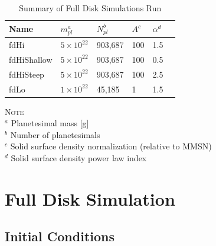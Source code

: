 \documentclass[twocolumn]{aastex63}
\begin{document}
\begin{table}
\caption{Summary of Full Disk Simulations Run}
\begin{tabular}{llllll} \hline \hline
Name    & $m_{pl}^{a}$ & $N_{pl}^{b}$ & $A^{c}$ & $\alpha^{d}$ &  \\ \hline
fdHi                 & $5 \times 10^{22}$ & 903,687 & 100                                                         & 1.5                              &   \\
fdHiShallow    & $5 \times 10^{22}$ & 903,687 & 100                                                        & 0.5                              &   \\
fdHiSteep       & $5 \times 10^{22}$ & 903,687 & 100                                                         & 2.5                              &   \\
fdLo                & $1 \times 10^{22}$ & 45,185    & 1                                                             & 1.5                              &   \\ \hline
\end{tabular}
\begin{flushleft}
\textsc{Note} \\ {$^a$ Planetesimal mass [g] \\
		       $^b$ Number of planetesimals \\
		       $^c$ Solid surface density normalization (relative to MMSN) \\
		       $^d$ Solid surface density power law index } \\
\end{flushleft}
\label{tab:sims}
\end{table}

\section{Full Disk Simulation}\label{sec:fulldisk}

\subsection{Initial Conditions}
\end{document}
